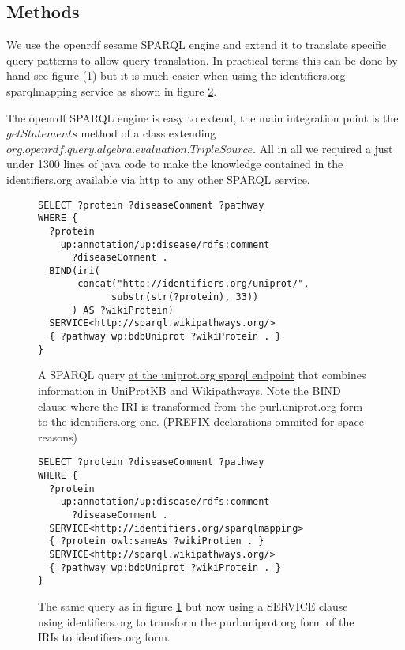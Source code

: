 \documentclass{bioinfo}
\begin{document}
\begin{methods}
\section{Methods}

We use the openrdf sesame SPARQL engine\cite{SESAME} and extend it to translate specific query patterns to allow query translation.
In practical terms this can be done by hand see figure (\ref{stringstuff}) but it is much easier when using the identifiers.org sparqlmapping service as shown in figure \ref{translatestuff}.

The openrdf SPARQL engine is easy to extend, the main integration point is the $getStatements$ method of a class extending $org.openrdf.query.algebra.evaluation.TripleSource$.
All in all we required a just under 1300 lines of java code to make the knowledge contained in the identifiers.org available via http to any other SPARQL service.


\begin{figure}
\begin{verbatim}
SELECT ?protein ?diseaseComment ?pathway
WHERE {
  ?protein 
    up:annotation/up:disease/rdfs:comment 
      ?diseaseComment .
  BIND(iri(
       concat("http://identifiers.org/uniprot/", 
             substr(str(?protein), 33))
      ) AS ?wikiProtein)
  SERVICE<http://sparql.wikipathways.org/>
  { ?pathway wp:bdbUniprot ?wikiProtein . }
}
\end{verbatim}
  \caption{A SPARQL query \href{http://beta.sparql.uniprot.org/sparql}{at the uniprot.org sparql endpoint} that combines information
  in UniProtKB and Wikipathways. Note the BIND clause where the IRI is transformed from the purl.uniprot.org form to the identifiers.org one. (PREFIX declarations ommited for space reasons)}
  \label{stringstuff}
\end{figure}

\begin{figure}
\begin{verbatim}
SELECT ?protein ?diseaseComment ?pathway
WHERE {
  ?protein 
    up:annotation/up:disease/rdfs:comment 
      ?diseaseComment .
  SERVICE<http://identifiers.org/sparqlmapping>
  { ?protein owl:sameAs ?wikiProtien . }
  SERVICE<http://sparql.wikipathways.org/>
  { ?pathway wp:bdbUniprot ?wikiProtein . }
}
\end{verbatim}
  \caption{The same query as in figure \ref{stringstuff} but now using a SERVICE clause using identifiers.org to transform the purl.uniprot.org form of the IRIs to identifiers.org form.}
  \label{translatestuff}
\end{figure} 



\end{methods}
\end{document}
